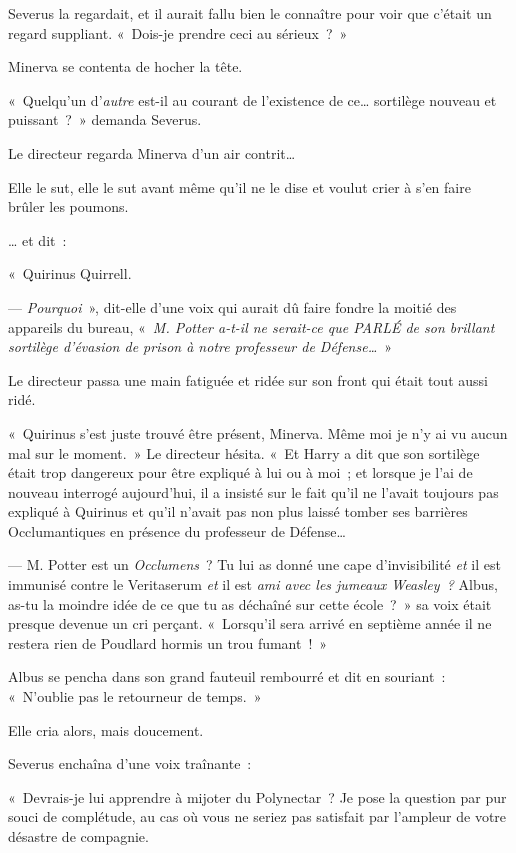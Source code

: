 Severus la regardait, et il aurait fallu bien le connaître pour voir que c'était un regard suppliant.
«~Dois-je prendre ceci au sérieux~?~»

Minerva se contenta de hocher la tête.

«~Quelqu'un d'\emph{autre} est-il au courant de l'existence de ce… sortilège nouveau et puissant~?~»
demanda Severus.

Le directeur regarda Minerva d'un air contrit…

Elle le sut, elle le sut avant même qu'il ne le dise et voulut crier à s'en faire brûler les poumons.

… et dit~:

«~Quirinus Quirrell.

--- \emph{Pourquoi}~», dit-elle d'une voix qui aurait dû faire fondre la moitié des appareils du bureau, «~\emph{M. Potter a-t-il ne serait-ce que PARLÉ de son brillant sortilège d'évasion de prison à notre professeur de Défense…}~»

Le directeur passa une main fatiguée et ridée sur son front qui était tout aussi ridé.

«~Quirinus s'est juste trouvé être présent, Minerva.
Même moi je n'y ai vu aucun mal sur le moment.~»
Le directeur hésita.
«~Et Harry a dit que son sortilège était trop dangereux pour être expliqué à lui ou à moi~; et lorsque je l'ai de nouveau interrogé aujourd'hui, il a insisté sur le fait qu'il ne l'avait toujours pas expliqué à Quirinus et qu'il n'avait pas non plus laissé tomber ses barrières Occlumantiques en présence du professeur de Défense…

--- M. Potter est un \emph{Occlumens}~?
Tu lui as donné une cape d'invisibilité \emph{et} il est immunisé contre le Veritaserum \emph{et} il est \emph{ami avec les jumeaux Weasley~?} Albus, as-tu la moindre idée de ce que tu as déchaîné sur cette école~?~»
sa voix était presque devenue un cri perçant.
«~Lorsqu'il sera arrivé en septième année il ne restera rien de Poudlard hormis un trou fumant~!~»

Albus se pencha dans son grand fauteuil rembourré et dit en souriant~: «~N'oublie pas le retourneur de temps.~»

Elle cria alors, mais doucement.

Severus enchaîna d'une voix traînante~:

«~Devrais-je lui apprendre à mijoter du Polynectar~?
Je pose la question par pur souci de complétude, au cas où vous ne seriez pas satisfait par l'ampleur de votre désastre de compagnie.

